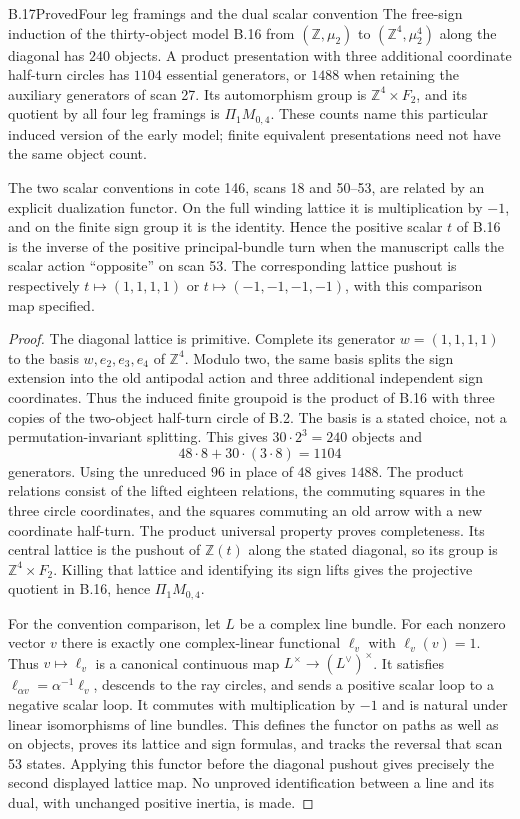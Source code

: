 \begin{result}{B.17}{Proved}{Four leg framings and the dual scalar convention}
The free-sign induction of the thirty-object model B.16 from
$(\mathbb Z,\mu_2)$ to $(\mathbb Z^4,\mu_2^4)$ along the diagonal
has $240$ objects.  A product presentation with three additional
coordinate half-turn circles has $1104$ essential generators,
or $1488$ when retaining the auxiliary generators of scan 27.
Its automorphism group is $\mathbb Z^4\times F_2$, and its
quotient by all four leg framings is $\Pi_1M_{0,4}$.
These counts name this particular induced version of the early
model; finite equivalent presentations need not have the same
object count.

The two scalar conventions in cote 146, scans 18 and 50--53,
are related by an explicit dualization functor.  On the full
winding lattice it is multiplication by $-1$, and on the finite
sign group it is the identity.  Hence the positive scalar $t$
of B.16 is the inverse of the positive principal-bundle turn
when the manuscript calls the scalar action ``opposite'' on
scan 53.  The corresponding lattice pushout is respectively
$t\mapsto(1,1,1,1)$ or $t\mapsto(-1,-1,-1,-1)$, with this
comparison map specified.
\end{result}
\begin{proof}
The diagonal lattice is primitive.  Complete its generator
$w=(1,1,1,1)$ to the basis $w,e_2,e_3,e_4$ of $\mathbb Z^4$.
Modulo two, the same basis splits the sign extension into the
old antipodal action and three additional independent sign
coordinates.  Thus the induced finite groupoid is the product
of B.16 with three copies of the two-object half-turn circle
of B.2.  The basis is a stated choice, not a permutation-invariant
splitting.  This gives $30\cdot2^3=240$ objects and
\[
 48\cdot8+30\cdot(3\cdot8)=1104
\]
generators.  Using the unreduced $96$ in place of $48$ gives
$1488$.  The product relations consist of the lifted eighteen
relations, the commuting squares in the three circle coordinates,
and the squares commuting an old arrow with a new coordinate
half-turn.  The product universal property proves completeness.
Its central lattice is the pushout of $\mathbb Z(t)$ along the
stated diagonal, so its group is $\mathbb Z^4\times F_2$.
Killing that lattice and identifying its sign lifts gives the
projective quotient in B.16, hence $\Pi_1M_{0,4}$.

For the convention comparison, let $L$ be a complex line bundle.
For each nonzero vector $v$ there is exactly one complex-linear
functional $\ell_v$ with $\ell_v(v)=1$.  Thus
$v\mapsto\ell_v$ is a canonical continuous map
$L^{\times}\to(L^{\vee})^{\times}$.  It satisfies
$\ell_{\alpha v}=\alpha^{-1}\ell_v$, descends to the ray circles,
and sends a positive scalar loop to a negative scalar loop.
It commutes with multiplication by $-1$ and is natural under
linear isomorphisms of line bundles.  This defines the functor
on paths as well as on objects, proves its lattice and sign
formulas, and tracks the reversal that scan 53 states.
Applying this functor before the diagonal pushout gives precisely
the second displayed lattice map.  No unproved identification
between a line and its dual, with unchanged positive inertia,
is made.
\end{proof}
